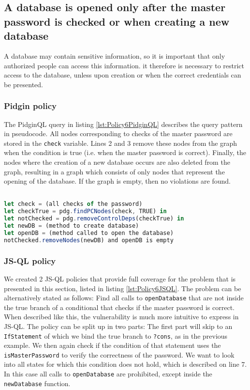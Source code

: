
\subsection{A database is opened only after the master password
is checked or when creating a new database}
\label{subsec:DBOpen}


A database may contain sensitive information, so it is important that only authorized people can access this information. it therefore is necessary to restrict access to the database, unless upon creation or when the correct credentials can be presented. 

\subsubsection*{Pidgin policy}

The PidginQL query in listing \ref{lst:Policy6PidginQL} describes the query pattern in pseudocode. All nodes corresponding to checks of the master password are stored in the \texttt{check} variable. Lines 2 and 3 remove these nodes from the graph when the condition is true (i.e. when the master password is correct). Finally, the nodes where the creation of a new database occurs are also deleted from the graph, resulting in a graph which consists of only nodes that represent the opening of the database. If the graph is empty, then no violations are found.

\begin{lstlisting}[label={lst:Policy6PidginQL},language=JavaScript,caption=Policy 6 in PidginQL,mathescape=true]  % float=t?

let check = (all checks of the password)
let checkTrue = pdg.findPCNodes(check, TRUE) in
let notChecked = pdg.removeControlDeps(checkTrue) in
let newDB = (method to create database)
let openDB = (method called to open the database)
notChecked.removeNodes(newDB) and openDB is empty
\end{lstlisting}

\subsubsection*{JS-QL policy}

We created 2 JS-QL policies that provide full coverage for the problem that is presented in this section, listed in listing \ref{lst:Policy6JSQL}. The problem can be alternatively stated as follows: Find all calls to \texttt{openDatabase} that are not inside the true branch of a conditional that checks if the master password is correct. When described like this, the vulnerability is much more intuitive to express in JS-QL. The policy can be split up in two parts: The first part will skip to an \texttt{IfStatement} of which we bind the true branch to \texttt{?cons}, as in the previous example. We then again check if the condition of that statement uses the \texttt{isMasterPassword} to verify the correctness of the password. We want to look into all states for which this condition does not hold, which is described on line 7. In this case all calls to \texttt{openDatabase} are prohibited, except inside the \texttt{newDatabase} function. 

